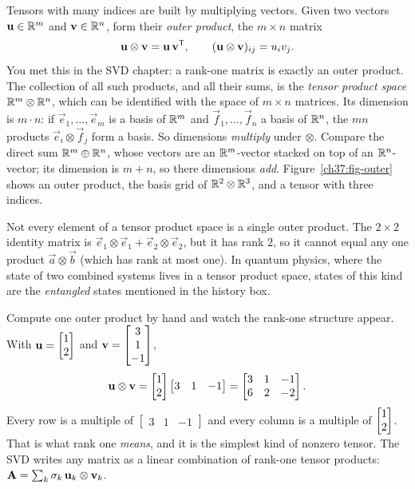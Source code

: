 Tensors with many indices are built by multiplying vectors. Given two vectors $\mathbf{u}\in\mathbb{R}^m$
and $\mathbf{v}\in\mathbb{R}^n$, form their \emph{outer product}, the $m\times n$ matrix
\[
  \mathbf{u}\otimes\mathbf{v} = \mathbf{u}\,\mathbf{v}^{\mathsf{T}},
  \qquad (\mathbf{u}\otimes\mathbf{v})_{ij} = u_i v_j.
\]
You met this in the SVD chapter: a rank-one matrix is exactly an outer product. The
collection of all such products, and all their sums, is the \emph{tensor product
space} $\mathbb{R}^m\otimes\mathbb{R}^n$, which can be identified with the space of $m\times n$ matrices.
Its dimension is $m\cdot n$: if $\vec{e}_1,\dots,\vec{e}_m$ is a basis of $\mathbb{R}^m$ and
$\vec{f}_1,\dots,\vec{f}_n$ a basis of $\mathbb{R}^n$, the $mn$ products
$\vec{e}_i\otimes\vec{f}_j$ form a basis. So dimensions \emph{multiply} under
$\otimes$. Compare the direct sum $\mathbb{R}^m\oplus\mathbb{R}^n$, whose vectors are an
$\mathbb{R}^m$-vector stacked on top of an $\mathbb{R}^n$-vector; its dimension is $m+n$, so there
dimensions \emph{add}. Figure~\ref{ch37:fig-outer} shows an outer product, the
basis grid of $\mathbb{R}^2\otimes\mathbb{R}^3$, and a tensor with three indices.

Not every element of a tensor product space is a single outer product. The
$2\times 2$ identity matrix is
$\vec{e}_1\otimes\vec{e}_1+\vec{e}_2\otimes\vec{e}_2$, but it has rank $2$, so it
cannot equal any one product $\vec{a}\otimes\vec{b}$ (which has rank at most one).
In quantum physics, where the state of two combined systems lives in a tensor
product space, states of this kind are the \emph{entangled} states mentioned in the
history box.

\begin{labbox}
Compute one outer product by hand and watch the rank-one structure appear. With
$\mathbf{u}=\begin{bmatrix}1\\2\end{bmatrix}$ and $\mathbf{v}=\begin{bmatrix}3\\1\\-1\end{bmatrix}$,
\[
  \mathbf{u}\otimes\mathbf{v} = \begin{bmatrix}1\\2\end{bmatrix}\begin{bmatrix}3&1&-1\end{bmatrix}
  = \begin{bmatrix}3&1&-1\\ 6&2&-2\end{bmatrix}.
\]
Every row is a multiple of $\begin{bmatrix}3&1&-1\end{bmatrix}$ and every
column is a multiple of $\begin{bmatrix}1\\2\end{bmatrix}$. That is what rank one \emph{means}, and it
is the simplest kind of nonzero tensor. The SVD writes any matrix as a
linear combination of rank-one tensor products:
$\mathbf{A}=\sum_k \sigma_k\,\mathbf{u}_k\otimes\mathbf{v}_k$.
\end{labbox}

